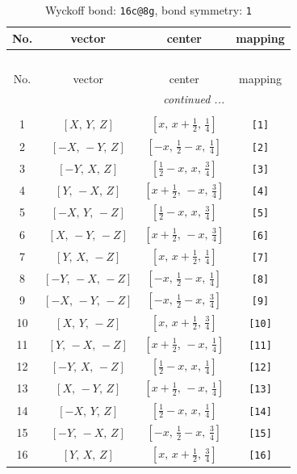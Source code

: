 \documentclass[fleqn,8pt]{jsarticle}
\begin{document}
\begin{longtable}{cccc}
\caption{Wyckoff bond: {\tt 16c@8g}, bond symmetry: {\tt 1}}
 \\
 \hline \hline
No. & vector & center & mapping \\ \hline \endfirsthead

\multicolumn{3}{l}{\tablename\ \thetable{}} \\
 \hline \hline
No. & vector & center & mapping \\ \hline \endhead

 \hline \hline
\multicolumn{3}{r}{\footnotesize\it continued ...} \\ \endfoot

 \hline \hline
\multicolumn{3}{r}{} \\ \endlastfoot

1 & $\left[ X,\, Y,\, Z \right]$ & $\left[ x,\, x + \frac{1}{2},\, \frac{1}{4} \right]$ & {\tt [1]} \\ \hline
2 & $\left[ - X,\, - Y,\, Z \right]$ & $\left[ - x,\, \frac{1}{2} - x,\, \frac{1}{4} \right]$ & {\tt [2]} \\ \hline
3 & $\left[ - Y,\, X,\, Z \right]$ & $\left[ \frac{1}{2} - x,\, x,\, \frac{3}{4} \right]$ & {\tt [3]} \\ \hline
4 & $\left[ Y,\, - X,\, Z \right]$ & $\left[ x + \frac{1}{2},\, - x,\, \frac{3}{4} \right]$ & {\tt [4]} \\ \hline
5 & $\left[ - X,\, Y,\, - Z \right]$ & $\left[ \frac{1}{2} - x,\, x,\, \frac{3}{4} \right]$ & {\tt [5]} \\ \hline
6 & $\left[ X,\, - Y,\, - Z \right]$ & $\left[ x + \frac{1}{2},\, - x,\, \frac{3}{4} \right]$ & {\tt [6]} \\ \hline
7 & $\left[ Y,\, X,\, - Z \right]$ & $\left[ x,\, x + \frac{1}{2},\, \frac{1}{4} \right]$ & {\tt [7]} \\ \hline
8 & $\left[ - Y,\, - X,\, - Z \right]$ & $\left[ - x,\, \frac{1}{2} - x,\, \frac{1}{4} \right]$ & {\tt [8]} \\ \hline
9 & $\left[ - X,\, - Y,\, - Z \right]$ & $\left[ - x,\, \frac{1}{2} - x,\, \frac{3}{4} \right]$ & {\tt [9]} \\ \hline
10 & $\left[ X,\, Y,\, - Z \right]$ & $\left[ x,\, x + \frac{1}{2},\, \frac{3}{4} \right]$ & {\tt [10]} \\ \hline
11 & $\left[ Y,\, - X,\, - Z \right]$ & $\left[ x + \frac{1}{2},\, - x,\, \frac{1}{4} \right]$ & {\tt [11]} \\ \hline
12 & $\left[ - Y,\, X,\, - Z \right]$ & $\left[ \frac{1}{2} - x,\, x,\, \frac{1}{4} \right]$ & {\tt [12]} \\ \hline
13 & $\left[ X,\, - Y,\, Z \right]$ & $\left[ x + \frac{1}{2},\, - x,\, \frac{1}{4} \right]$ & {\tt [13]} \\ \hline
14 & $\left[ - X,\, Y,\, Z \right]$ & $\left[ \frac{1}{2} - x,\, x,\, \frac{1}{4} \right]$ & {\tt [14]} \\ \hline
15 & $\left[ - Y,\, - X,\, Z \right]$ & $\left[ - x,\, \frac{1}{2} - x,\, \frac{3}{4} \right]$ & {\tt [15]} \\ \hline
16 & $\left[ Y,\, X,\, Z \right]$ & $\left[ x,\, x + \frac{1}{2},\, \frac{3}{4} \right]$ & {\tt [16]} \\
\end{longtable}
\end{document}
